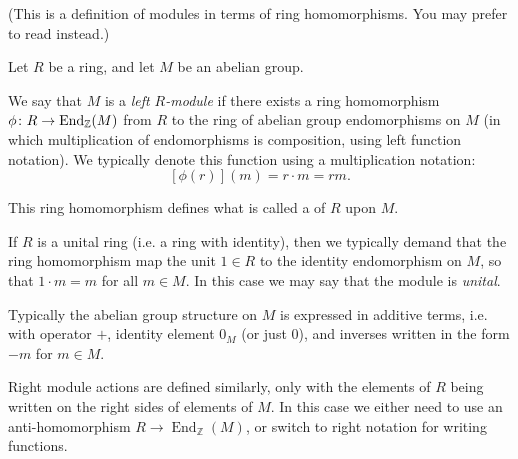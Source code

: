 \documentclass{article}
\begin{document}

(This is a definition of modules in terms of ring homomorphisms. You may prefer to read  instead.)

Let $R$ be a ring, 
and let $M$ be an abelian group.

We say that $M$ is a {\it left $R$-module}
if there exists a ring homomorphism $\phi\colon R \to {\rm End}_{\Bbb{Z}}(M)$ 
from $R$ to the ring of abelian group endomorphisms on $M$
(in which multiplication of endomorphisms is composition,
using left function notation).
We typically denote this function using a multiplication notation:
$$[\phi(r)](m) = r \cdot m = rm.$$

This ring homomorphism defines 
what is called a {}
of $R$ upon $M$.

If $R$ is a unital ring 
(i.e. a ring with identity),
then we typically demand
that the ring homomorphism
map the unit $1 \in R$
to the identity endomorphism on $M$,
so that $1 \cdot m = m$ for all $m \in M$.
In this case we may say 
that the module is \emph{unital}.

Typically the abelian group structure on $M$
is expressed in additive terms,
i.e. with operator $+$, 
identity element $0_M$ (or just $0$),
and inverses written in 
the form $-m$ for $m \in M$.


%
%
%
%
%
%
%
%
%

Right module actions are defined similarly,
only with the elements of $R$ being written
on the right sides of elements of $M$.
In this case we either need to use 
an anti-homomorphism $R \to \operatorname{End}_{\mathbb{Z}}(M)$,
or switch to right notation for writing functions.
\end{document}
